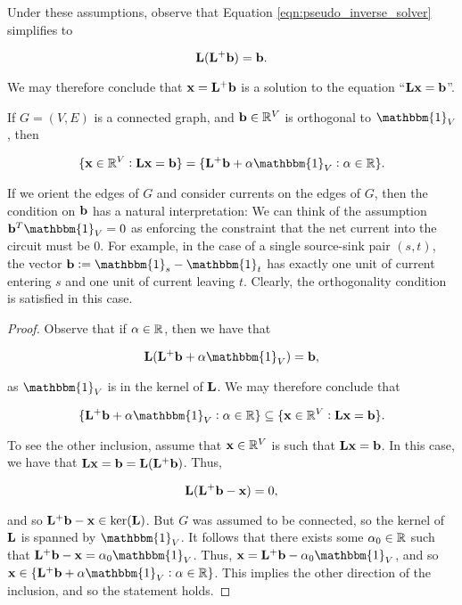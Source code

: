 \documentclass[11pt]{article}
\begin{document}
Under these assumptions, observe that Equation \ref{eqn:pseudo_inverse_solver} simplifies to

\[
	\V{L}(\V{L}^{+}\V{b})= \V{b}.
\]

We may therefore conclude that $\V{x} = \V{L}^{+}\V{b}$ is a solution to the equation ``$\V{Lx}=\V{b}$''.

\begin{lemma}\label{lem:Laplacian_solution_characterization}

If $G=(V,E)$ is a connected graph, and $\V{b} \in \rea^{V}$ is orthogonal to $\mathbbm{1}_{V}$,
then 

\[
	\{ \V{x} \in \rea^{V}: \V{Lx}=\V{b}\} = \{\V{L}^{+}\V{b}+ \alpha \mathbbm{1}_{V}: \alpha \in \rea\}.
\]


\end{lemma}

\begin{remark}

If we orient the edges of $G$ and consider currents on the edges of $G$, then the condition on $\V{b}$
has a natural interpretation: We can think of the assumption $\V{b}^{T} \mathbbm{1}_{V}=0$ as enforcing
the constraint that the net current into the circuit must be $0$. For example, in the case of a single source-sink pair $(s,t)$,
the vector $\V{b}:=\mathbbm{1}_{s}-\mathbbm{1}_{t}$ has exactly one unit of current entering $s$ and one unit of current leaving
$t$. Clearly, the orthogonality condition is satisfied in this case.



\end{remark}


\begin{proof}

Observe that if $\alpha \in \mathbb R$, then we have that

\[
	\V{L}(\V{L}^{+}\V{b}+\alpha \mathbbm{1}_{V})=\V{b},
\]

as $\mathbbm{1}_{V}$ is in the kernel of $\V{L}$. We may therefore
conclude that

\[
 \{\V{L}^{+}\V{b}+ \alpha \mathbbm{1}_{V}: \alpha \in \rea\} \subseteq \{ \V{x} \in \rea^{V}: \V{Lx}=\V{b}\}.
\]

To see the other inclusion, assume that $\V{x} \in \rea^{V}$ is such that
$\V{Lx}=\V{b}$. In this case, we have that $\V{Lx}=\V{b} = \V{L}(\V{L}^{+}\V{b})$.
Thus,

\[
	\V{L}( \V{L}^{+}\V{b}-\V{x}) = 0,
\]

and so $\V{L}^{+}\V{b}-\V{x} \in \text{ker}(\V{L})$. But $G$ was assumed to be
connected, so the kernel of $\V{L}$ is spanned by $\mathbbm{1}_{V}$. It follows that
there exists some $\alpha_{0} \in \mathbb R$ such that $\V{L}^{+}\V{b}-\V{x} = \alpha_{0} \mathbbm{1}_{V}$.
Thus, $\V{x} = \V{L}^{+}\V{b}-\alpha_{0} \mathbbm{1}_{V}$, and so $\V{x} \in \{\V{L}^{+}\V{b}+ \alpha \mathbbm{1}_{V}: \alpha \in \rea\}$.
This implies the other direction of the inclusion, and so the statement holds.

\end{proof}
\end{document}
